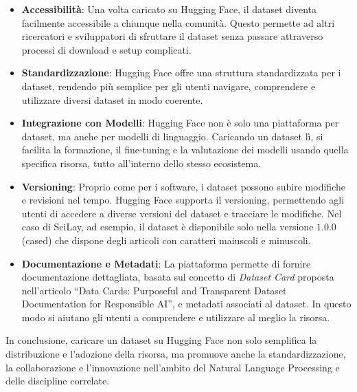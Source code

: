 \documentclass[12pt,a4paper,twoside,openright]{book}
\begin{document}
\begin{itemize}
    \item \textbf{Accessibilità}: Una volta caricato su Hugging Face, il dataset diventa facilmente accessibile a chiunque nella comunità. Questo permette ad altri ricercatori e sviluppatori di sfruttare il dataset senza passare attraverso processi di download e setup complicati.
    \item \textbf{Standardizzazione}: Hugging Face offre una struttura standardizzata per i dataset, rendendo più semplice per gli utenti navigare, comprendere e utilizzare diversi dataset in modo coerente. 
    \item \textbf{Integrazione con Modelli}: Hugging Face non è solo una piattaforma per dataset, ma anche per modelli di linguaggio. Caricando un dataset lì, si facilita la formazione, il fine-tuning e la valutazione dei modelli usando quella specifica risorsa, tutto all'interno dello stesso ecosistema.
    \item \textbf{Versioning}: Proprio come per i software, i dataset possono subire modifiche e revisioni nel tempo. Hugging Face supporta il versioning, permettendo agli utenti di accedere a diverse versioni del dataset e tracciare le modifiche. Nel caso di SciLay, ad esempio, il dataset è disponibile solo nella versione $1.0.0$ (cased) che dispone degli articoli con caratteri maiuscoli e minuscoli.
    \item \textbf{Documentazione e Metadati}: La piattaforma permette di fornire documentazione dettagliata, basata sul concetto di \emph{Dataset Card} proposta nell'articolo ``Data Cards: Purposeful and Transparent Dataset Documentation for Responsible AI''\cite{pushkarna2022data}, e metadati associati al dataset. In questo modo si aiutano gli utenti a comprendere e utilizzare al meglio la risorsa.
\end{itemize}

In conclusione, caricare un dataset su Hugging Face non solo semplifica la distribuzione e l'adozione della risorsa, ma promuove anche la standardizzazione, la collaborazione e l'innovazione nell'ambito del Natural Language Processing e delle discipline correlate. 
\end{document}
